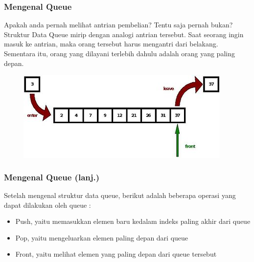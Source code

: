 \begin{frame}
\frametitle{Mengenal Queue}

Apakah anda pernah melihat antrian pembelian? Tentu saja pernah bukan?
\newline
\newline
Struktur Data Queue mirip dengan analogi antrian tersebut. Saat seorang ingin masuk ke antrian, maka orang tersebut harus mengantri dari belakang. Sementara itu, orang yang dilayani terlebih dahulu adalah orang yang paling depan.

\begin{figure}
	\centering
	\includegraphics[width=6 cm]{asset/queue.jpg}
\end{figure}
\end{frame}

\begin{frame}
\frametitle{Mengenal Queue (lanj.)}

Setelah mengenal struktur data queue, berikut adalah beberapa operasi yang dapat dilakukan oleh queue :
\begin{itemize}
	\item Push, yaitu memasukkan elemen baru kedalam indeks paling akhir dari queue
	\item Pop, yaitu mengeluarkan elemen paling depan dari queue
	\item Front, yaitu melihat elemen yang paling depan dari queue tersebut
\end{itemize}
\end{frame}




